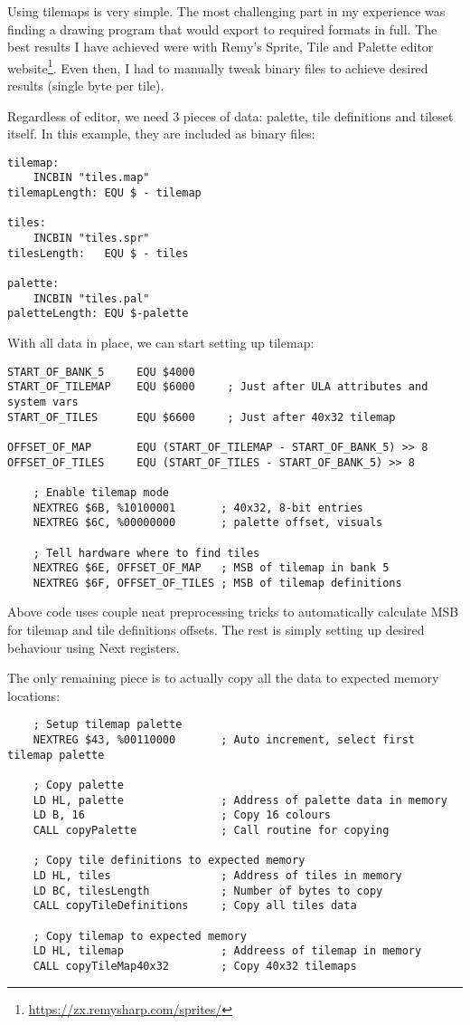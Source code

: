 \documentclass[12pt,twoside,openright,a4paper]{book}
\begin{document}
Using tilemaps is very simple. The most challenging part in my experience was finding a drawing program that would export to required formats in full. The best results I have achieved were with Remy's Sprite, Tile and Palette editor website\footnote{\url{https://zx.remysharp.com/sprites/}}. Even then, I had to manually tweak binary files to achieve desired results (single byte per tile).

Regardless of editor, we need 3 pieces of data: palette, tile definitions and tileset itself. In this example, they are included as binary files:

\begin{Verbatim}
tilemap:
	INCBIN "tiles.map"
tilemapLength: EQU $ - tilemap

tiles:
	INCBIN "tiles.spr"
tilesLength:   EQU $ - tiles

palette:
	INCBIN "tiles.pal"
paletteLength: EQU $-palette
\end{Verbatim}

With all data in place, we can start setting up tilemap:

\begin{Verbatim}
START_OF_BANK_5     EQU $4000
START_OF_TILEMAP    EQU $6000     ; Just after ULA attributes and system vars
START_OF_TILES      EQU $6600     ; Just after 40x32 tilemap

OFFSET_OF_MAP       EQU (START_OF_TILEMAP - START_OF_BANK_5) >> 8
OFFSET_OF_TILES     EQU (START_OF_TILES - START_OF_BANK_5) >> 8

	; Enable tilemap mode
	NEXTREG $6B, %10100001       ; 40x32, 8-bit entries
	NEXTREG $6C, %00000000       ; palette offset, visuals

	; Tell hardware where to find tiles
	NEXTREG $6E, OFFSET_OF_MAP   ; MSB of tilemap in bank 5
	NEXTREG $6F, OFFSET_OF_TILES ; MSB of tilemap definitions
\end{Verbatim}

Above code uses couple neat preprocessing tricks to automatically calculate MSB for tilemap and tile definitions offsets. The rest is simply setting up desired behaviour using Next registers.

The only remaining piece is to actually copy all the data to expected memory locations:

\begin{Verbatim}
	; Setup tilemap palette
	NEXTREG $43, %00110000       ; Auto increment, select first tilemap palette

	; Copy palette
	LD HL, palette               ; Address of palette data in memory
	LD B, 16                     ; Copy 16 colours
	CALL copyPalette             ; Call routine for copying

	; Copy tile definitions to expected memory
	LD HL, tiles                 ; Address of tiles in memory
	LD BC, tilesLength           ; Number of bytes to copy
	CALL copyTileDefinitions     ; Copy all tiles data

	; Copy tilemap to expected memory
	LD HL, tilemap               ; Addreess of tilemap in memory
	CALL copyTileMap40x32        ; Copy 40x32 tilemaps
\end{Verbatim}
\end{document}
